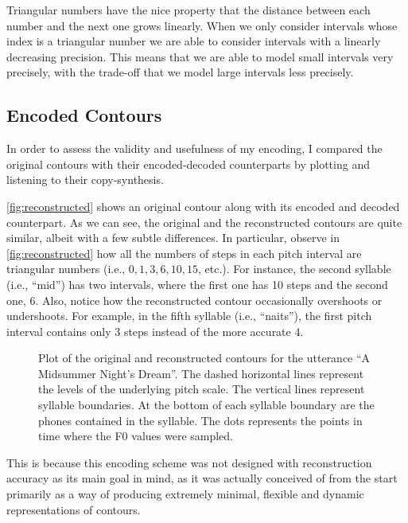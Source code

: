 Triangular numbers have the nice property that the distance between each number and the next one grows linearly.
When we only consider intervals whose index is a triangular number we are able to consider intervals with a linearly decreasing precision.
This means that we are able to model small intervals very precisely, with the trade-off that we model large intervals less precisely.



\subsection{Encoded Contours}

In order to assess the validity and usefulness of my encoding, I compared the original contours with their encoded-decoded counterparts by plotting and listening to their copy-synthesis.


\autoref{fig:reconstructed} shows an original contour along with its encoded and decoded counterpart. 
As we can see, the original and the reconstructed contours are quite similar, albeit with a few subtle differences. 
In particular, observe in \autoref{fig:reconstructed} how all the numbers of steps in each pitch interval are triangular numbers (i.e., $0, 1, 3, 6, 10, 15$, etc.).
For instance, the second syllable (i.e., ``mid'') has two intervals, where the first one has 10 steps and the second one, 6.
Also, notice how the reconstructed contour occasionally overshoots or undershoots.
For example, in the fifth syllable (i.e., ``naits''), the first pitch interval contains only 3 steps instead of the more accurate 4.

\begin{figure}[h]
\centering
\resizebox{\textwidth}{!}{}
\caption[Reconstructed contour]{Plot of the original and reconstructed contours for the utterance  ``A Midsummer Night's Dream''. The dashed horizontal lines represent the levels of the underlying pitch scale. The vertical lines represent syllable boundaries. At the bottom of each syllable boundary are the phones contained in the syllable. The dots represents the points in time where the \ac{F0} values were sampled.}
\label{fig:reconstructed}
\end{figure}



This is because this encoding scheme was not designed with reconstruction accuracy as its main goal in mind, as it was actually conceived of from the start primarily as a way of producing extremely minimal,  flexible and dynamic representations of contours.

